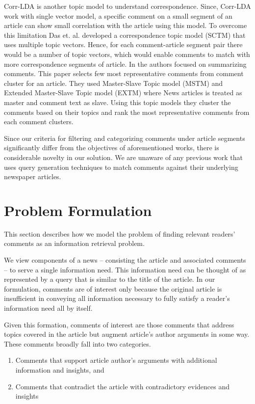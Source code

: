 \documentclass[article]{IEEEtran}
\newcounter{tmpc}
\begin{document}
Corr-LDA \cite{Titov:2008:MOR:1367497.1367513} is another topic model to understand correspondence. Since, Corr-LDA work with single vector model, a specific comment on a small segment of an article can show small correlation with the article using this model. To overcome this limitation Das et. al. \cite{Das:2014:GBC:2556195.2556231} developed a correspondence topic model (SCTM) that uses multiple topic vectors. Hence, for each comment-article segment pair there would be a number of topic vectors, which would enable comments to match with more correspondence segments of article. In \cite{Ma:2012:TRC:2396761.2396798} the authors focused on summarizing comments. This paper selects few most representative comments from comment cluster for an article. They used Master-Slave Topic model (MSTM) and Extended Master-Slave Topic model (EXTM) where News articles is treated as master and comment text as slave. Using this topic models they cluster the comments based on their topics and rank the most representative comments from each comment clusters.

Since our criteria for filtering and categorizing comments under article segments significantly differ from the objectives of aforementioned works, there is considerable novelty in our solution. We are unaware of any previous work that uses query generation techniques to match comments against their underlying newspaper articles.       

\section{Problem Formulation}
\label{pf}
This section describes how we model the problem of finding relevant readers' comments as an information retrieval problem.

We view components of a news -- consisting the article and associated comments --  to serve a single information need. This information need can be thought of as represented by a query that is similar to the title of the article. In our formulation, comments are of interest only because the original article is insufficient in conveying all information necessary to fully satisfy a reader's information need all by itself. 

Given this formation, comments of interest are those comments that address topics covered in the article but augment article's author arguments in some way. These comments broadly fall into two categories.  

\begin{enumerate}
\item Comments that support article author's arguments with additional information and insights, and
\item Comments that contradict the article with contradictory evidences and insights
\setcounter{tmpc}{\theenumi}
\end{enumerate}
\end{document}
